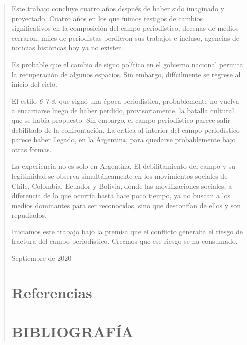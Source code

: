 \begin{quote}
Este trabajo concluye cuatro años después de haber sido imaginado y proyectado. Cuatro años en los que fuimos testigos de cambios significativos en la composición del campo periodístico, decenas de medios cerraron, miles de periodistas perdieron sus trabajos e incluso, agencias de noticias históricas hoy ya no existen.

Es probable que el cambio de signo político en el gobierno nacional permita la recuperación de algunos espacios. Sin embargo, difícilmente se regrese al inicio del ciclo.

El estilo \emph{6 7 8}, que signó una época periodística, probablemente no vuelva a encarnarse luego de haber perdido, provisoriamente, la batalla cultural que se había propuesto. Sin embargo, el campo periodístico parece salir debilitado de la confrontación. La crítica al interior del campo periodístico parece haber llegado, en la Argentina, para quedarse probablemente bajo otras formas.

La experiencia no es solo en Argentina. El debilitamiento del campo y su legitimidad se observa simultáneamente en los movimientos sociales de Chile, Colombia, Ecuador y Bolivia, donde las movilizaciones sociales, a diferencia de lo que ocurría hasta hace poco tiempo, ya no buscan a los medios dominantes para ser reconocidos, sino que desconfían de ellos y son repudiados.

Iniciamos este trabajo bajo la premisa que el conflicto generaba el riesgo de fractura del campo periodístico. Creemos que ese riesgo se ha consumado.

Septiembre de 2020


\chapter[\hspace{1.5pc}Referencias]{Referencias}
\justifying
\printbibliography[heading=none]

\fi

\chapter {BIBLIOGRAFÍA}


\end{quote}
